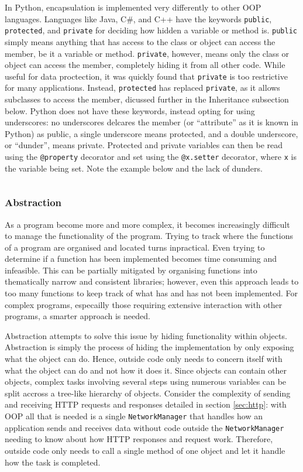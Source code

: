 \documentclass[11pt]{article}
\begin{document}
In Python, encapsulation is implemented very differently to other OOP languages. Languages like Java, C\#, and C++ have the keywords \texttt{public}, \texttt{protected}, and \texttt{private} for deciding how hidden a variable or method is. \texttt{public} simply means anything that has access to the class or object can access the member, be it a variable or method. \texttt{private}, however, means only the class or object can access the member, completely hiding it from all other code. While useful for data proctection, it was quickly found that \texttt{private} is too restrictive for many applications. Instead, \texttt{protected} has replaced \texttt{private}, as it allows subclasses to access the member, dicussed further in the Inheritance subsection below. Python does not have these keywords, instead opting for using underscores: no underscores delcares the member (or ``attribute'' as it is known in Python) as public, a single underscore means protected, and a double underscore, or ``dunder'', means private. Protected and private variables can then be read using the \texttt{@property} decorator and set using the \texttt{@x.setter} decorator, where \texttt{x} is the variable being set. Note the example below and the lack of dunders.

\inputminted[linenos=true]{python}{python_examples/encapsulation.py}

\subsubsection{Abstraction}

As a program become more and more complex, it becomes increasingly difficult to manage the functionality of the program. Trying to track where the functions of a program are organised and located turns inpractical. Even trying to determine if a function has been implemented becomes time consuming and infeasible. This can be partially mitigated by organising functions into thematically narrow and consistent libraries; however, even this approach leads to too many functions to keep track of what has and has not been implemented. For complex programs, especailly those requiring extensive interaction with other programs, a smarter approach is needed.

Abstraction attempts to solve this issue by hiding functionality within objects. Abstraction is simply the process of hiding the implementation by only exposing what the object can do. Hence, outside code only needs to concern itself with what the object can do and not how it does it. Since objects can contain other objects, complex tasks involving several steps using numerous variables can be split accross a tree-like hierarchy of objects. Consider the complexity of sending and receiving HTTP requests and responses detailed in section \ref{sec:http}: with OOP all that is needed is a single \texttt{NetworkManager} that handles how an application sends and receives data without code outside the \texttt{NetworkManager} needing to know about how HTTP responses and request work. Therefore, outside code only needs to call a single method of one object and let it handle how the task is completed.
\end{document}
